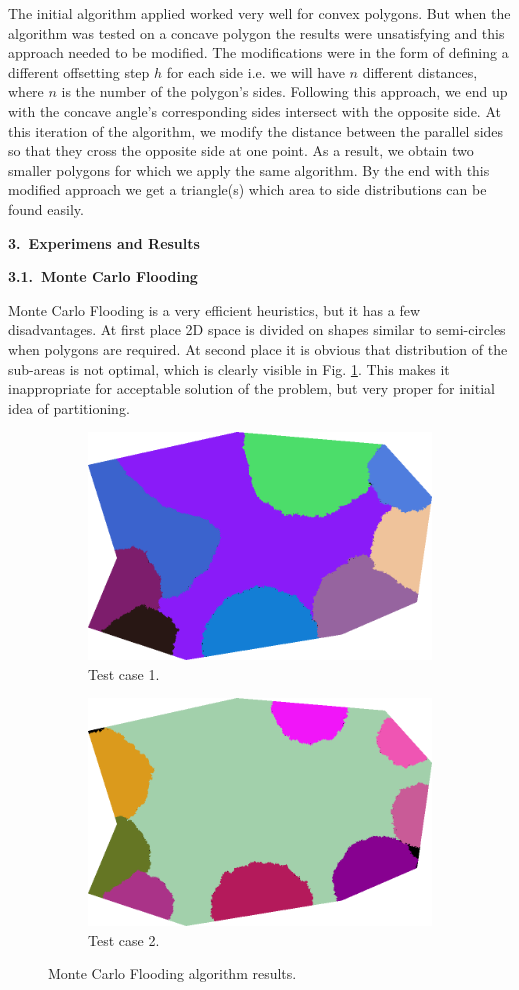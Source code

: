 \documentclass[11pt,leqno]{book}
\newcommand{\sect}[1]{\vskip7mm\par{\large \bf #1}}
\newcommand{\subsect}[1]{\vskip 3mm\par{\bf#1}}
\begin{document}
The initial algorithm applied worked very well for convex polygons. But when the algorithm was tested on a concave polygon the results were unsatisfying and this approach needed to be modified. The modifications were in the form of defining a different offsetting step $h$ for each side i.e. we will have $n$ different distances, where $n$ is the number of the polygon's sides. Following this approach, we end up with the concave angle's corresponding sides intersect with the opposite side. At this iteration of the algorithm, we modify the distance between the parallel sides so that they cross the opposite side at one point. As a result, we obtain two smaller polygons for which we apply the same algorithm. By the end with this modified approach we get a triangle(s) which area to side distributions can be found easily.

\sect{3.~Experimens and Results}

\subsect{3.1.~Monte Carlo Flooding}

Monte Carlo Flooding is a very efficient heuristics, but it has a few disadvantages. At first place 2D space is divided on shapes similar to semi-circles when polygons are required. At second place it is obvious that distribution of the sub-areas is not optimal, which is clearly visible in Fig. \ref{fig:sub7}. This makes it inappropriate for acceptable solution of the problem, but very proper for initial idea of partitioning. 

\begin{figure}[h!]
\centering
\begin{subfigure}{.5\textwidth}
  \centering
  \includegraphics[width=.5\linewidth]{pic08.png}
  \caption{Test case 1.}
  \label{fig:sub7}
\end{subfigure}
\begin{subfigure}{.5\textwidth}
  \centering
  \includegraphics[width=.5\linewidth]{pic09.png}
  \caption{Test case 2.}
  \label{fig:sub8}
\end{subfigure}
\caption{Monte Carlo Flooding algorithm results.}
\label{fig:five}
\end{figure}
\FloatBarrier
\end{document}
